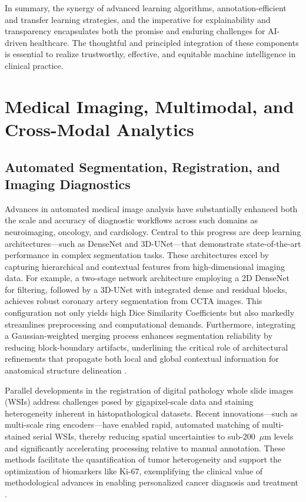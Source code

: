 In summary, the synergy of advanced learning algorithms, annotation-efficient and transfer learning strategies, and the imperative for explainability and transparency encapsulates both the promise and enduring challenges for AI-driven healthcare. The thoughtful and principled integration of these components is essential to realize trustworthy, effective, and equitable machine intelligence in clinical practice.

\section{Medical Imaging, Multimodal, and Cross-Modal Analytics}

\subsection{Automated Segmentation, Registration, and Imaging Diagnostics}

Advances in automated medical image analysis have substantially enhanced both the scale and accuracy of diagnostic workflows across such domains as neuroimaging, oncology, and cardiology. Central to this progress are deep learning architectures—such as DenseNet and 3D-UNet—that demonstrate state-of-the-art performance in complex segmentation tasks. These architectures excel by capturing hierarchical and contextual features from high-dimensional imaging data. For example, a two-stage network architecture employing a 2D DenseNet for filtering, followed by a 3D-UNet with integrated dense and residual blocks, achieves robust coronary artery segmentation from CCTA images. This configuration not only yields high Dice Similarity Coefficients but also markedly streamlines preprocessing and computational demands. Furthermore, integrating a Gaussian-weighted merging process enhances segmentation reliability by reducing block-boundary artifacts, underlining the critical role of architectural refinements that propagate both local and global contextual information for anatomical structure delineation \cite{ref94}.

Parallel developments in the registration of digital pathology whole slide images (WSIs) address challenges posed by gigapixel-scale data and staining heterogeneity inherent in histopathological datasets. Recent innovations—such as multi-scale ring encoders—have enabled rapid, automated matching of multi-stained serial WSIs, thereby reducing spatial uncertainties to sub-200~$\mu$m levels and significantly accelerating processing relative to manual annotation. These methods facilitate the quantification of tumor heterogeneity and support the optimization of biomarkers like Ki-67, exemplifying the clinical value of methodological advances in enabling personalized cancer diagnosis and treatment \cite{ref100}.

